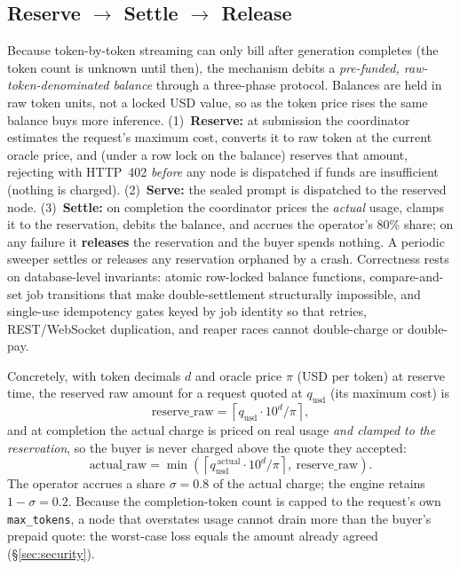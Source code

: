 \documentclass[11pt]{article}
\begin{document}
\subsection{Reserve $\rightarrow$ Settle $\rightarrow$ Release}
Because token-by-token streaming can only bill after generation completes (the token count is unknown until then), the mechanism debits a \textit{pre-funded, raw-token-denominated balance} through a three-phase protocol. Balances are held in raw token units, not a locked USD value, so as the token price rises the same balance buys more inference. (1)~\textbf{Reserve:} at submission the coordinator estimates the request's maximum cost, converts it to raw token at the current oracle price, and (under a row lock on the balance) reserves that amount, rejecting with HTTP~402 \textit{before} any node is dispatched if funds are insufficient (nothing is charged). (2)~\textbf{Serve:} the sealed prompt is dispatched to the reserved node. (3)~\textbf{Settle:} on completion the coordinator prices the \textit{actual} usage, clamps it to the reservation, debits the balance, and accrues the operator's 80\% share; on any failure it \textbf{releases} the reservation and the buyer spends nothing. A periodic sweeper settles or releases any reservation orphaned by a crash. Correctness rests on database-level invariants: atomic row-locked balance functions, compare-and-set job transitions that make double-settlement structurally impossible, and single-use idempotency gates keyed by job identity so that retries, REST/WebSocket duplication, and reaper races cannot double-charge or double-pay.

Concretely, with token decimals $d$ and oracle price $\pi$ (USD per token) at reserve time, the reserved raw amount for a request quoted at $q_{\text{usd}}$ (its maximum cost) is
\begin{equation}
\text{reserve\_raw} = \left\lceil q_{\text{usd}} \cdot 10^{d} / \pi \right\rceil,
\end{equation}
and at completion the actual charge is priced on real usage \textit{and clamped to the reservation}, so the buyer is never charged above the quote they accepted:
\begin{equation}
\text{actual\_raw} = \min\!\left(\left\lceil q_{\text{usd}}^{\,\text{actual}} \cdot 10^{d} / \pi \right\rceil,\ \text{reserve\_raw} \right).
\end{equation}
The operator accrues a share $\sigma=0.8$ of the actual charge; the engine retains $1-\sigma=0.2$. Because the completion-token count is capped to the request's own \texttt{max\_tokens}, a node that overstates usage cannot drain more than the buyer's prepaid quote: the worst-case loss equals the amount already agreed (\S\ref{sec:security}).
\end{document}
